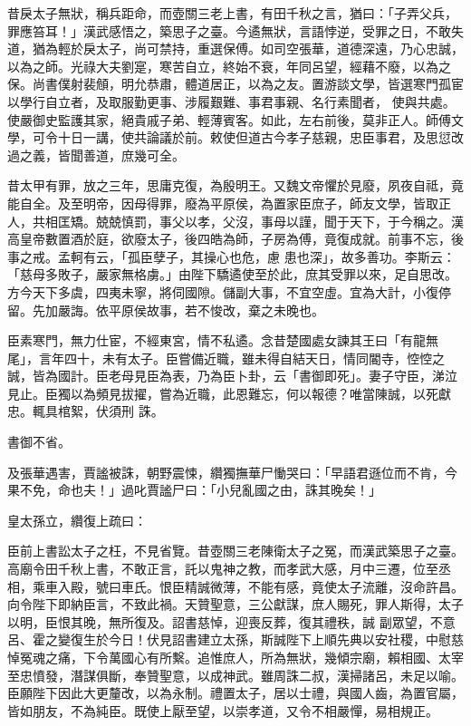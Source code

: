 \begin{pinyinscope}
 昔戾太子無狀，稱兵距命，而壺關三老上書，有田千秋之言，猶曰：「子弄父兵，罪應笞耳！」漢武感悟之，築思子之臺。今遹無狀，言語悖逆，受罪之日，不敢失道，猶為輕於戾太子，尚可禁持，重選保傅。如司空張華，道德深遠，乃心忠誠，以為之師。光祿大夫劉寔，寒苦自立，終始不衰，年同呂望，經藉不廢，以為之保。尚書僕射裴頠，明允恭肅，體道居正，以為之友。置游談文學，皆選寒門孤宦以學行自立者，及取服勤更事、涉履艱難、事君事親、名行素聞者，
 使與共處。使嚴御史監護其家，絕貴戚子弟、輕薄賓客。如此，左右前後，莫非正人。師傅文學，可令十日一講，使共論議於前。敕使但道古今孝子慈親，忠臣事君，及思愆改過之義，皆聞善道，庶幾可全。



 昔太甲有罪，放之三年，思庸克復，為殷明王。又魏文帝懼於見廢，夙夜自祗，竟能自全。及至明帝，因母得罪，廢為平原侯，為置家臣庶子，師友文學，皆取正人，共相匡矯。兢兢慎罰，事父以孝，父沒，事母以謹，聞于天下，于今稱之。漢高皇帝數置酒於庭，欲廢太子，後四皓為師，子房為傅，竟復成就。前事不忘，後事之戒。孟軻有云，「孤臣孽子，其操心也危，慮
 患也深」，故多善功。李斯云：「慈母多敗子，嚴家無格虜。」由陛下驕遹使至於此，庶其受罪以來，足自思改。方今天下多虞，四夷未寧，將伺國隙。儲副大事，不宜空虛。宜為大計，小復停留。先加嚴誨。依平原侯故事，若不悛改，棄之未晚也。



 臣素寒門，無力仕宦，不經東宮，情不私遹。念昔楚國處女諫其王曰「有龍無尾」，言年四十，未有太子。臣嘗備近職，雖未得自結天日，情同閽寺，悾悾之誠，皆為國計。臣老母見臣為表，乃為臣卜卦，云「書御即死」。妻子守臣，涕泣見止。臣獨以為頻見拔擢，嘗為近職，此恩難忘，何以報德？唯當陳誠，以死獻忠。輒具棺絮，伏須刑
 誅。



 書御不省。



 及張華遇害，賈謐被誅，朝野震悚，纘獨撫華尸慟哭曰：「早語君遜位而不肯，今果不免，命也夫！」過叱賈謐尸曰：「小兒亂國之由，誅其晚矣！」



 皇太孫立，纘復上疏曰：



 臣前上書訟太子之枉，不見省覽。昔壺關三老陳衛太子之冤，而漢武築思子之臺。高廟令田千秋上書，不敢正言，託以鬼神之教，而孝武大感，月中三遷，位至丞相，乘車入殿，號曰車氏。恨臣精誠微薄，不能有感，竟使太子流離，沒命許昌。向令陛下即納臣言，不致此禍。天贊聖意，三公獻謀，庶人賜死，罪人斯得，太子以明，臣恨其晚，無所復及。詔書慈悼，迎喪反葬，復其禮秩，誠
 副眾望，不意呂、霍之變復生於今日！伏見詔書建立太孫，斯誠陛下上順先典以安社稷，中慰慈悼冤魂之痛，下令萬國心有所繫。追惟庶人，所為無狀，幾傾宗廟，賴相國、太宰至忠憤發，潛謀俱斷，奉贊聖意，以成神武。雖周誅二叔，漢掃諸呂，未足以喻。臣願陛下因此大更釐改，以為永制。禮置太子，居以士禮，與國人齒，為置官屬，皆如朋友，不為純臣。既使上厭至望，以崇孝道，又令不相嚴憚，易相規正。




\end{pinyinscope}
